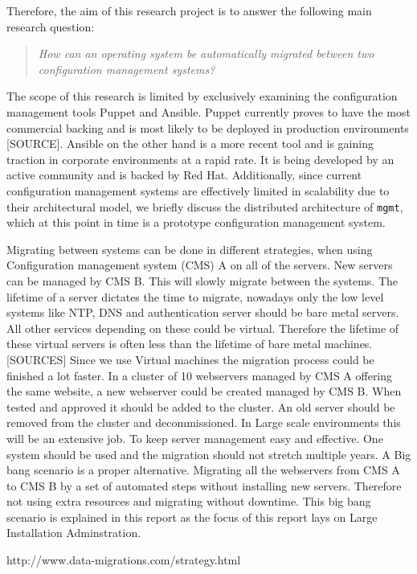 Therefore, the aim of this research project is to answer the following main research question:

\begin{quote}
\textit{How can an operating system be automatically migrated between two configuration management systems?} %
\end{quote}

\noindent
The scope of this research is limited by exclusively examining the configuration management tools Puppet and Ansible. Puppet currently proves to have the most commercial backing and is most likely to be deployed in production environments [SOURCE]. Ansible on the other hand is a more recent tool and is gaining traction in corporate environments at a rapid rate. It is being developed by an active community and is backed by Red Hat. Additionally, since current configuration management systems are effectively limited in scalability due to their architectural model, we briefly discuss the distributed architecture of \texttt{mgmt}, which at this point in time is a prototype configuration management system.

Migrating between systems can be done in different strategies, when using Configuration management system (CMS) A on all of the servers. New servers can be managed by CMS B. This will slowly migrate between the systems. The lifetime of a server dictates the time to migrate, nowadays only the low level systems like NTP, DNS and authentication server should be bare metal servers. All other services depending on these could be virtual. Therefore the lifetime of these virtual servers is often less than the lifetime of bare metal machines. [SOURCES] Since we use Virtual machines the migration process could be finished a lot faster. In a cluster of 10 webservers managed by CMS A offering the same website, a new webserver could be created managed by CMS B. When tested and approved it should be added to the cluster. An old server should be removed from the cluster and decommissioned. In Large scale environments this will be an extensive job.
To keep server management easy and effective. One system should be used and the migration should not stretch multiple years. A Big bang scenario is a proper alternative. Migrating all the webservers from CMS A to CMS B by a set of automated steps without installing new servers. Therefore not using extra resources and migrating without downtime. This big bang scenario is explained in this report as the focus of this report lays on Large Installation Adminstration.
     
http://www.data-migrations.com/strategy.html

